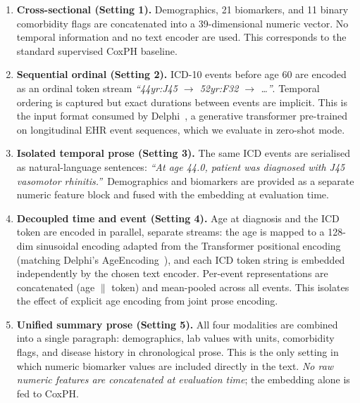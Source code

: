 \begin{enumerate}
  \item \textbf{Cross-sectional (Setting 1).}
        Demographics, 21 biomarkers, and 11 binary comorbidity flags are
        concatenated into a 39-dimensional numeric vector.
        No temporal information and no text encoder are used.
        This corresponds to the standard supervised CoxPH baseline.

  \item \textbf{Sequential ordinal (Setting 2).}
        ICD-10 events before age 60 are encoded as an ordinal token stream
        \textit{``44yr:J45 $\rightarrow$ 52yr:F32 $\rightarrow$ \ldots''}.
        Temporal ordering is captured but exact durations between events are
        implicit.
        This is the input format consumed by Delphi~\cite{delphi2024},
        a generative transformer pre-trained on longitudinal EHR event
        sequences, which we evaluate in zero-shot mode.

  \item \textbf{Isolated temporal prose (Setting 3).}
        The same ICD events are serialised as natural-language sentences:
        \textit{``At age 44.0, patient was diagnosed with J45 vasomotor
        rhinitis.''}\
        Demographics and biomarkers are provided as a separate numeric
        feature block and fused with the embedding at evaluation time.

  \item \textbf{Decoupled time and event (Setting 4).}
        Age at diagnosis and the ICD token are encoded in parallel, separate
        streams: the age is mapped to a 128-dim sinusoidal encoding adapted
        from the Transformer positional encoding~\cite{vaswani2017attention}
        (matching Delphi's AgeEncoding~\cite{delphi2024}), and each ICD token string is
        embedded independently by the chosen text encoder.
        Per-event representations are concatenated (age $\parallel$ token)
        and mean-pooled across all events.
        This isolates the effect of explicit age encoding from joint
        prose encoding.

  \item \textbf{Unified summary prose (Setting 5).}
        All four modalities are combined into a single paragraph:
        demographics, lab values with units, comorbidity flags, and disease
        history in chronological prose.
        This is the only setting in which numeric biomarker values are
        included directly in the text.
        \emph{No raw numeric features are concatenated at evaluation time};
        the embedding alone is fed to CoxPH.
\end{enumerate}

